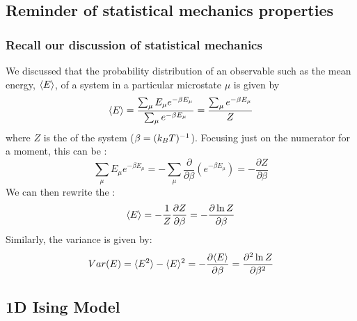 \documentclass[hyperref={colorlinks=true}]{beamer}
\begin{document}
\subsection[Reminder of statistical mechanics properties]{Reminder of statistical mechanics properties}

\begin{frame}%
  \frametitle{Recall our discussion of statistical mechanics}
  
  We discussed that the probability distribution of an observable such as the mean energy, $\langle E \rangle$, of a system in a particular microstate $\mu$ is given by
%
  \begin{equation}
    \langle E \rangle = \frac{\sum_{\mu} E_{\mu} e^{-\beta E_{\mu}}}{{\sum_{\mu} e^{-\beta E_{\mu}}}} = \frac{{\sum_{\mu} e^{-\beta E_{\mu}}}}{Z}
  \end{equation}
%
where $Z$ is the  of the system ($\beta=(k_B T)^{-1}$). \pause Focusing just on the numerator for a moment, this can be : 
%
  \begin{equation}
    \sum_{\mu} E_{\mu} e^{-\beta E_{\mu}} = -\sum_{\mu} \frac{\partial}{\partial\beta}\left( e^{-\beta E_{\mu}} \right) =  -\frac{\partial Z}{\partial\beta} 
  \end{equation}
%  
  \pause We can then rewrite the :
%  
  \begin{equation}
    \langle E \rangle = -\frac{1}{Z}\frac{\partial Z}{\partial\beta} = -\frac{\partial \ln Z}{\partial\beta}         
  \end{equation} 
% 
 \pause Similarly, the variance is given by:
%
  \begin{equation}
    Var(E) = \langle E^2 \rangle - \langle E \rangle^2 = -\frac{\partial \langle E \rangle}{\partial\beta} = \frac{\partial^2 \ln Z}{\partial\beta^2}           
  \end{equation} 

\end{frame}

\subsection[1D Ising Model]{1D Ising Model}
\end{document}
